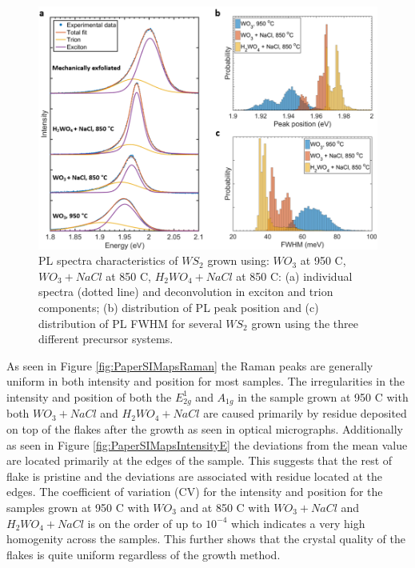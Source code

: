 \begin{figure}[h]
\begin{center}
\includegraphics[scale=0.3]{PaperPLSpectraHistograms.png}
\caption{PL spectra characteristics of $WS_2$ grown using: $WO_3$ at 950 {\degree}C, $WO_3+NaCl$ at 850 {\degree}C, $H_2WO_4+NaCl$ at 850 {\degree}C: (a) individual spectra (dotted line) and deconvolution in exciton and trion components; (b) distribution of PL peak position and (c) distribution of PL FWHM for several $WS_2$ grown using the three different precursor systems.}
\label{fig:PaperPLSpectraHistograms}
\end{center}
\end{figure}

As seen in Figure \ref{fig:PaperSIMapsRaman} the Raman peaks are generally uniform in both intensity and position for most samples. The irregularities in the intensity and position of both the $E^1_{2g}$ and $A_{1g}$ in the sample grown at 950 {\degree}C with both $WO_3 + NaCl$ and $H_2WO_4 + NaCl$ are caused primarily by residue deposited on top of the flakes after the growth as seen in optical micrographs. Additionally as seen in Figure \ref{fig:PaperSIMapsIntensityE} the deviations from the mean value are located primarily at the edges of the sample. This suggests that the rest of flake is pristine and the deviations are associated with residue located at the edges. The coefficient of variation (CV) for the intensity and position for the samples grown at 950 {\degree}C with $WO_3$ and at 850 {\degree}C with $WO_3 + NaCl$ and $H_2WO_4 + NaCl$ is on the order of up to $10^{-4}$ which indicates a very high homogenity across the samples. This further shows that the crystal quality of the flakes is quite uniform regardless of the growth method.

